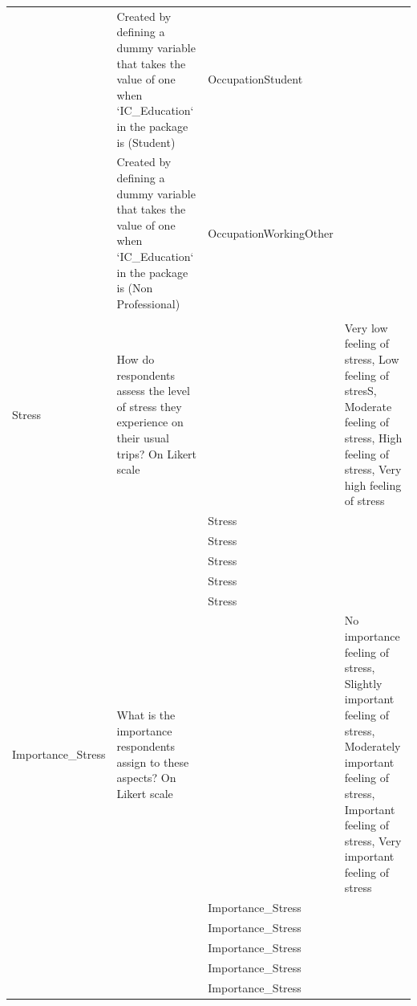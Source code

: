 \documentclass[
11pt, %
oneside, %
english, %
singlespacing, %
]{macthesis} %
\begin{document}
\begin{longtable}[t]{l>{\raggedright\arraybackslash}p{10em}>{\raggedright\arraybackslash}p{10em}>{\raggedright\arraybackslash}p{10em}}
\hspace{1em} & Created by defining a dummy variable that takes the value of one when `IC\_Education` in the package is (Student) & OccupationStudent & \\
\hspace{1em} & Created by defining a dummy variable that takes the value of one when `IC\_Education` in the package is (Non Professional) & OccupationWorkingOther & \\
\addlinespace[0.3em]
\multicolumn{4}{l}{\textbf{Stress Characteristics}}\\
\hspace{1em}Stress & How do respondents assess the level of stress they experience on their usual trips? On Likert scale &  & Very low feeling of stress, Low feeling of stresS, Moderate feeling of stress, High feeling of stress, Very high feeling of stress\\
\hspace{1em} &  & Stress \vphantom{4} & \\
\hspace{1em} &  & Stress \vphantom{3} & \\
\hspace{1em} &  & Stress \vphantom{2} & \\
\hspace{1em} &  & Stress \vphantom{1} & \\
\hspace{1em} &  & Stress & \\
\hspace{1em}Importance\_Stress & What is the importance respondents assign to these aspects? On Likert scale &  & No importance feeling of stress, Slightly important feeling of stress,  Moderately important feeling of stress, Important feeling of stress, Very important feeling of stress\\
\hspace{1em} &  & Importance\_Stress \vphantom{4} & \\
\hspace{1em} &  & Importance\_Stress \vphantom{3} & \\
\hspace{1em} &  & Importance\_Stress \vphantom{2} & \\
\hspace{1em} &  & Importance\_Stress \vphantom{1} & \\
\hspace{1em} &  & Importance\_Stress & \\*
\end{longtable}
\endgroup{}
\end{document}
